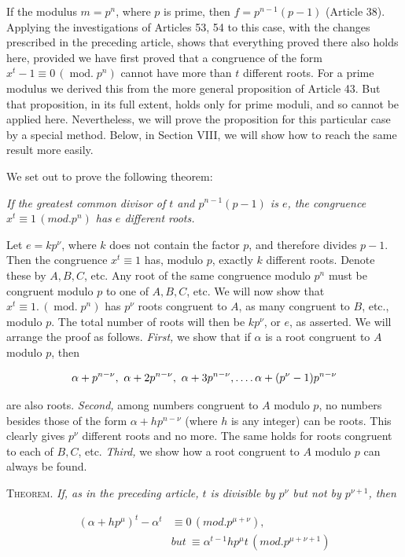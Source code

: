 If the modulus $m=p^n$, where $p$ is prime, then $f=p^{n-1}(p-1)$ (Article 38). Applying the investigations of Articles 53, 54 to this case, with the changes prescribed in the preceding article, shows that everything proved there also holds here, provided we have first proved that a congruence of the form $x^t-1\equiv0\,(\operatorname{mod.}p^n)$ cannot have more than $t$ different roots. For a prime modulus we derived this from the more general proposition of Article 43. But that proposition, in its full extent, holds only for prime moduli, and so cannot be applied here. Nevertheless, we will prove the proposition for this particular case by a special method. Below, in Section VIII, we will show how to reach the same result more easily.

We set out to prove the following theorem:

\emph{If the greatest common divisor of $t$ and $p^{n-1}(p-1)$ is $e$, the congruence $x^t\equiv1\,(\mathit{mod.}p^n)$ has $e$ different roots.}

Let $e=kp^{\nu}$, where $k$ does not contain the factor $p$, and therefore divides $p-1$.
Then the congruence $x^t\equiv1$ has, modulo $p$, exactly $k$ different roots. Denote these by $A,B,C$, etc. Any root of the same congruence modulo $p^n$ must be congruent modulo $p$ to one of $A,B,C$, etc. We will now show that $x^t\equiv1.\,(\operatorname{mod.}p^n)$ has $p^{\nu}$ roots congruent to $A$, as many congruent to $B$, etc., modulo $p$. The total number of roots will then be $kp^{\nu}$, or $e$, as asserted. We will arrange the proof as follows. \emph{First,} we show that if $\alpha$ is a root congruent to $A$ modulo $p$, then

\[\alpha+p^{n-\nu},\ \alpha+2p^{n-\nu},\ \alpha+3p^{n-\nu},\mathinner{.\,.\,.\,.}\alpha+(p^{\nu}-1)p^{n-\nu}\]

are also roots. \emph{Second,} among numbers congruent to $A$ modulo $p$, no numbers besides those of the form $\alpha+hp^{n-\nu}$ (where $h$ is any integer) can be roots. This clearly gives $p^{\nu}$ different roots and no more. The same holds for roots congruent to each of $B,C$, etc. \emph{Third,} we show how a root congruent to $A$ modulo $p$ can always be found.

\textsc{Theorem.} \emph{If, as in the preceding article, $t$ is divisible by $p^{\nu}$ but not by $p^{\nu+1}$, then}

\[\begin{aligned}
(\alpha+hp^{\mu})^t-\alpha^t&\equiv0\,(mod.p^{\mu+\nu}),\\
&\textit{but}\ \equiv\alpha^{t-1}hp^{\mu}t\,(mod.p^{\mu+\nu+1})
\end{aligned}\]


